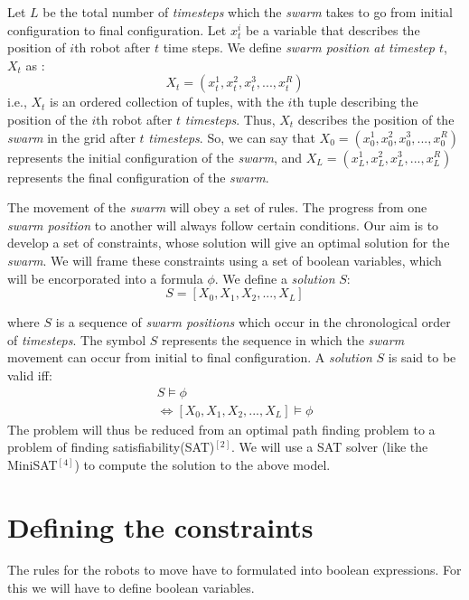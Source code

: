 \documentclass{article}[11pt]
\begin{document}
		Let $L$ be the total number of \textit{timesteps} which the \textit{swarm} takes to go from initial configuration to final configuration.  
		Let $x_t^i$ be a variable that describes the position of $i$th robot after $t$ time steps.
		We define \textit{swarm position at timestep $t$}, $X_t$ as :
		$$
			X_t = (x_t^1, x_t^2, x_t^3, . . . , x_t^R)
		$$
		i.e., $X_t$ is an ordered collection of tuples, with the $i$th tuple describing the position of the $i$th robot after $t$ \textit{timesteps}.
		Thus, $X_t$ describes the position of the \textit{swarm} in the grid after $t$ \textit{timesteps}. So, we can say that $X_0 =(x_0^1, x_0^2, x_0^3, . . . , x_0^R)$ represents the initial configuration of the \textit{swarm}, and $X_L = (x_L^1, x_L^2, x_L^3, . . . , x_L^R)$ represents the final configuration of the \textit{swarm}.

		The movement of the \textit{swarm} will obey a set of rules. The progress from one \textit{swarm position} to another will always follow certain conditions.
		Our aim is to develop a set of constraints, whose solution will give an optimal solution for the \textit{swarm}.
		We will frame these constraints using a set of boolean variables, which will be encorporated into a formula $\phi$.
		We define a \textit{solution} $S$:
		$$
			S = [X_0, X_1, X_2, . . . , X_L]  
		$$

		where $S$ is a sequence of \textit{swarm positions} which occur in the chronological order of \textit{timesteps}.
		The symbol $S$ represents the sequence in which the \textit{swarm} movement can occur from initial to final configuration.
		A \textit{solution} $S$ is said to be valid iff:
		\begin{gather}
				S \models \phi \\
			\Leftrightarrow  [X_0, X_1, X_2, . . . , X_L] \models \phi
		\end{gather}
		The problem will thus be reduced from an optimal path finding problem to a problem of finding satisfiability(SAT)$^{[2]}$. 
		We will use a SAT solver (like the MiniSAT$^{[4]}$) to compute the solution to the above model.

	\section{Defining the constraints}
		The rules for the robots to move have to formulated into boolean expressions. For this we will have to define boolean variables.
\end{document}
